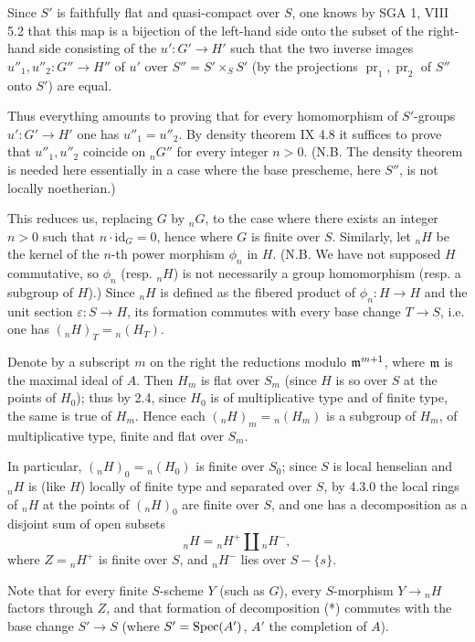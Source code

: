 Since $S'$ is faithfully flat and quasi-compact over $S$, one knows by SGA 1, VIII 5.2 that this map is a bijection of the left-hand side onto the subset of the right-hand side consisting of the $u':G'\to H'$ such that the two inverse images $u''_1,u''_2:G''\to H''$ of $u'$ over $S''=S'\times_S S'$ (by the projections $\operatorname{pr}_1,\operatorname{pr}_2$ of $S''$ onto $S'$) are equal.

Thus everything amounts to proving that for every homomorphism of $S'$-groups $u':G'\to H'$ one has $u''_1=u''_2$. By density theorem IX 4.8 it suffices to prove that $u''_1,u''_2$ coincide on ${}_nG''$ for every integer $n>0$. (N.B. The density theorem is needed here essentially in a case where the base prescheme, here $S''$, is not locally noetherian.)

This reduces us, replacing $G$ by ${}_nG$, to the case where there exists an integer $n>0$ such that $n\cdot\mathrm{id}_G=0$, hence where $G$ is finite over $S$. Similarly, let ${}_nH$ be the kernel of the $n$-th power morphism $\phi_n$ in $H$. (N.B. We have not supposed $H$ commutative, so $\phi_n$ (resp. ${}_nH$) is not necessarily a group homomorphism (resp. a subgroup of $H$).) Since ${}_nH$ is defined as the fibered product of $\phi_n:H\to H$ and the unit section $\varepsilon:S\to H$, its formation commutes with every base change $T\to S$, i.e. one has $({}_nH)_T={}_n(H_T)$.

 Denote by a subscript $m$ on the right the reductions modulo $\mathfrak m^{m+1}$, where $\mathfrak m$ is the maximal ideal of $A$. Then $H_m$ is flat over $S_m$ (since $H$ is so over $S$ at the points of $H_0$); thus by 2.4, since $H_0$ is of multiplicative type and of finite type, the same is true of $H_m$. Hence each $({}_nH)_m={}_n(H_m)$ is a subgroup of $H_m$, of multiplicative type, finite and flat over $S_m$.

In particular, $({}_nH)_0={}_n(H_0)$ is finite over $S_0$; since $S$ is local henselian and ${}_nH$ is (like $H$) locally of finite type and separated over $S$, by 4.3.0 the local rings of ${}_nH$ at the points of $({}_nH)_0$ are finite over $S$, and one has a decomposition as a disjoint sum of open subsets
\begin{equation}\tag{*}
{}_nH={}_nH^+\coprod{}_nH^-,
\end{equation}
where $Z={}_nH^+$ is finite over $S$, and ${}_nH^-$ lies over $S-\{s\}$.

Note that for every finite $S$-scheme $Y$ (such as $G$), every $S$-morphism $Y\to{}_nH$ factors through $Z$, and that formation of decomposition (*) commutes with the base change $S'\to S$ (where $S'=\operatorname{Spec}(A')$, $A'$ the completion of $A$).

